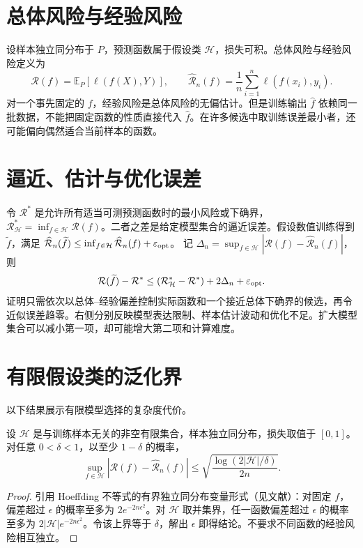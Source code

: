 \documentclass[UTF8,12pt,a4paper,fontset=fandol]{ctexbook}
\begin{document}
\section{总体风险与经验风险}

设样本独立同分布于 $P$，预测函数属于假设类 $\mathcal H$，损失可积。总体风险与经验风险定义为
\begin{equation}
 \mathcal R(f)=\mathbb E_P[\ell(f(X),Y)],\qquad
 \widehat{\mathcal R}_n(f)=\frac1n\sum_{i=1}^n\ell(f(x_i),y_i).
 \label{eq:ml-risk}
\end{equation}
对一个事先固定的 $f$，经验风险是总体风险的无偏估计。但是训练输出 $\widehat f$ 依赖同一批数据，不能把固定函数的性质直接代入 $\widehat f$。在许多候选中取训练误差最小者，还可能偏向偶然适合当前样本的函数。

\section{逼近、估计与优化误差}

令 $\mathcal R^*$ 是允许所有适当可测预测函数时的最小风险或下确界，$\mathcal R_{\mathcal H}^*=\inf_{f\in\mathcal H}\mathcal R(f)$。二者之差是给定模型集合的逼近误差。假设数值训练得到 $\widetilde f$，满足
$\widehat{\mathcal R}_n(\widetilde f)\leq\inf_{f\in\mathcal H}\widehat{\mathcal R}_n(f)+\varepsilon_{\rm opt}$。
记 $\Delta_n=\sup_{f\in\mathcal H}|\mathcal R(f)-\widehat{\mathcal R}_n(f)|$，则
\[
 \mathcal R(\widetilde f)-\mathcal R^*
 \leq(\mathcal R_{\mathcal H}^*-\mathcal R^*)+2\Delta_n+\varepsilon_{\rm opt}.
\]
证明只需依次以总体--经验偏差控制实际函数和一个接近总体下确界的候选，再令近似误差趋零。右侧分别反映模型表达限制、样本估计波动和优化不足。扩大模型集合可以减小第一项，却可能增大第二项和计算难度。

\section{有限假设类的泛化界}

以下结果展示有限模型选择的复杂度代价。
\begin{theorem}[有限类的一致偏差界]
设 $\mathcal H$ 是与训练样本无关的非空有限集合，样本独立同分布，损失取值于 $[0,1]$。对任意 $0<\delta<1$，以至少 $1-\delta$ 的概率，
\begin{equation}
 \sup_{f\in\mathcal H}|\mathcal R(f)-\widehat{\mathcal R}_n(f)|
 \leq\sqrt{\frac{\log(2|\mathcal H|/\delta)}{2n}}.
 \label{eq:ml-finite-bound}
\end{equation}
\end{theorem}
\begin{proof}
引用 Hoeffding 不等式的有界独立同分布变量形式（见文献\cite[附录B.4]{ml-uml}）：对固定 $f$，偏差超过 $\epsilon$ 的概率至多为 $2e^{-2n\epsilon^2}$。对 $\mathcal H$ 取并集界，任一函数偏差超过 $\epsilon$ 的概率至多为 $2|\mathcal H|e^{-2n\epsilon^2}$。令该上界等于 $\delta$，解出 $\epsilon$ 即得结论。不要求不同函数的经验风险相互独立。
\end{proof}
\end{document}
